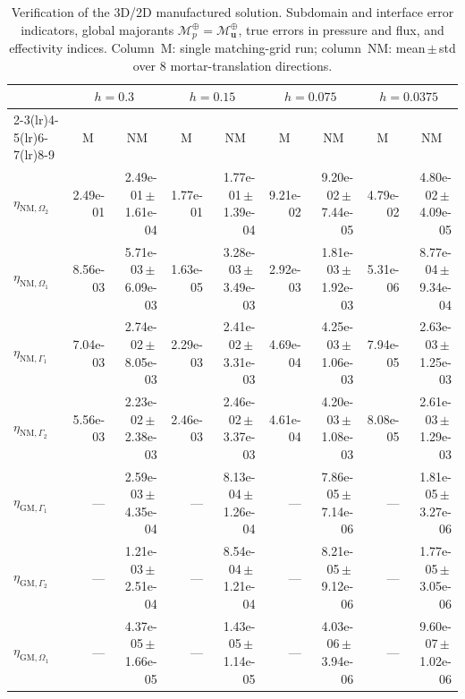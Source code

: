 \begin{table}
\centering
\caption{Verification of the 3D/2D manufactured solution. Subdomain and interface error indicators, global majorants $\mathcal{M}^\oplus_p = \mathcal{M}^\oplus_{\bm{u}}$, true errors in pressure and flux, and effectivity indices. Column~M: single matching-grid run; column~NM: mean\,$\pm$\,std over 8 mortar-translation directions.}
\label{tab:verification_consolidated}
\begin{tabular}{lrrrrrrrr}
\toprule
& \multicolumn{2}{c}{$h = 0.3$} & \multicolumn{2}{c}{$h = 0.15$} & \multicolumn{2}{c}{$h = 0.075$} & \multicolumn{2}{c}{$h = 0.0375$} \\
\cmidrule(lr){2-3}\cmidrule(lr){4-5}\cmidrule(lr){6-7}\cmidrule(lr){8-9}
& \multicolumn{1}{c}{M} & \multicolumn{1}{c}{NM} & \multicolumn{1}{c}{M} & \multicolumn{1}{c}{NM} & \multicolumn{1}{c}{M} & \multicolumn{1}{c}{NM} & \multicolumn{1}{c}{M} & \multicolumn{1}{c}{NM} \\
\midrule
$\eta_{\mathrm{NM},\Omega_2}$ & 2.49e-01 & 2.49e-01\,$\pm$\,1.61e-04 & 1.77e-01 & 1.77e-01\,$\pm$\,1.39e-04 & 9.21e-02 & 9.20e-02\,$\pm$\,7.44e-05 & 4.79e-02 & 4.80e-02\,$\pm$\,4.09e-05 \\
$\eta_{\mathrm{NM},\Omega_1}$ & 8.56e-03 & 5.71e-03\,$\pm$\,6.09e-03 & 1.63e-05 & 3.28e-03\,$\pm$\,3.49e-03 & 2.92e-03 & 1.81e-03\,$\pm$\,1.92e-03 & 5.31e-06 & 8.77e-04\,$\pm$\,9.34e-04 \\
$\eta_{\mathrm{NM},\Gamma_1}$ & 7.04e-03 & 2.74e-02\,$\pm$\,8.05e-03 & 2.29e-03 & 2.41e-02\,$\pm$\,3.31e-03 & 4.69e-04 & 4.25e-03\,$\pm$\,1.06e-03 & 7.94e-05 & 2.63e-03\,$\pm$\,1.25e-03 \\
$\eta_{\mathrm{NM},\Gamma_2}$ & 5.56e-03 & 2.23e-02\,$\pm$\,2.38e-03 & 2.46e-03 & 2.46e-02\,$\pm$\,3.37e-03 & 4.61e-04 & 4.20e-03\,$\pm$\,1.08e-03 & 8.08e-05 & 2.61e-03\,$\pm$\,1.29e-03 \\
$\eta_{\mathrm{GM},\Gamma_1}$ & $\text{---}$ & 2.59e-03\,$\pm$\,4.35e-04 & $\text{---}$ & 8.13e-04\,$\pm$\,1.26e-04 & $\text{---}$ & 7.86e-05\,$\pm$\,7.14e-06 & $\text{---}$ & 1.81e-05\,$\pm$\,3.27e-06 \\
$\eta_{\mathrm{GM},\Gamma_2}$ & $\text{---}$ & 1.21e-03\,$\pm$\,2.51e-04 & $\text{---}$ & 8.54e-04\,$\pm$\,1.21e-04 & $\text{---}$ & 8.21e-05\,$\pm$\,9.12e-06 & $\text{---}$ & 1.77e-05\,$\pm$\,3.05e-06 \\
$\eta_{\mathrm{GM},\Omega_1}$ & $\text{---}$ & 4.37e-05\,$\pm$\,1.66e-05 & $\text{---}$ & 1.43e-05\,$\pm$\,1.14e-05 & $\text{---}$ & 4.03e-06\,$\pm$\,3.94e-06 & $\text{---}$ & 9.60e-07\,$\pm$\,1.02e-06 \\

\end{tabular}
\end{table}
